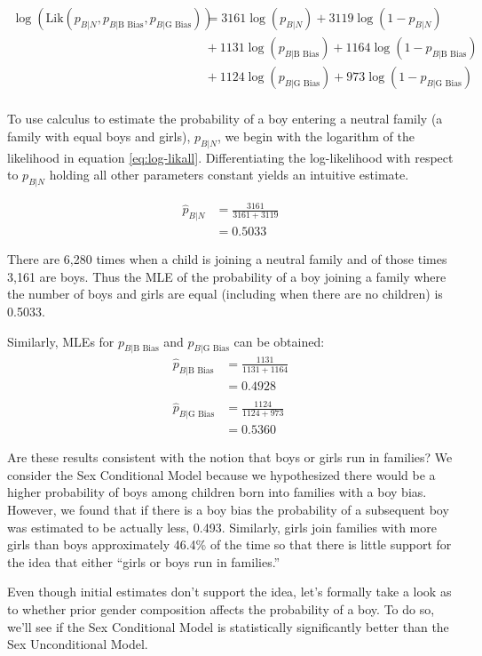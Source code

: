 \documentclass[
]{krantz}
\newcommand{\Lik}{\mathrm{Lik}}
\newcommand{\neutral}{p_{B|N}}
\newcommand{\gbias}{p_{B|\textrm{G Bias}}}
\newcommand{\bbias}{p_{B|\textrm{B Bias}}}
\begin{document}
\begin{align}
\log(\Lik(\neutral,  \bbias, \gbias)) &= 3161\log(\neutral)+3119\log(1-\neutral)\\ 
 & {}+1131\log(\bbias)+1164\log(1-\bbias)\\   
 & {}+1124\log(\gbias)+ 973\log(1-\gbias)\\
\label{eq:log-likall} 
\end{align}

To use calculus to estimate the probability of a boy entering a neutral family (a family with equal boys and girls), \(\neutral\), we begin with the logarithm of the likelihood in equation \eqref{eq:log-likall}. Differentiating the log-likelihood with respect to \(\neutral\) holding all other parameters constant yields an intuitive estimate.

\begin{align*}
 \hat{p}_{B|N}&=\frac{3161}{3161+3119} \\
 &=0.5033
\end{align*}

There are 6,280 times when a child is joining a neutral family and of those times 3,161 are boys. Thus the MLE of the probability of a boy joining a family where the number of boys and girls are equal (including when there are no children) is 0.5033.

Similarly, MLEs for \(\bbias\) and \(\gbias\) can be obtained:
\begin{align*}
 \hat{p}_{B|\textrm{B Bias}}&= \frac{1131}{1131+1164}\\
 & =  0.4928 \\
 &  \\
 \hat{p}_{B|\textrm{G Bias}}&=\frac{1124}{1124+973}\\
&= 0.5360
\end{align*}

Are these results consistent with the notion that boys or girls run in families? We consider the Sex Conditional Model because we hypothesized there would be a higher probability of boys among children born into families with a boy bias. However, we found that if there is a boy bias the probability of a subsequent boy was estimated to be actually less, 0.493. Similarly, girls join families with more girls than boys approximately 46.4\% of the time so that there is little support for the idea that either ``girls or boys run in families.''

Even though initial estimates don't support the idea, let's formally take a look as to whether prior gender composition affects the probability of a boy. To do so, we'll see if the Sex Conditional Model is statistically significantly better than the Sex Unconditional Model.
\end{document}
